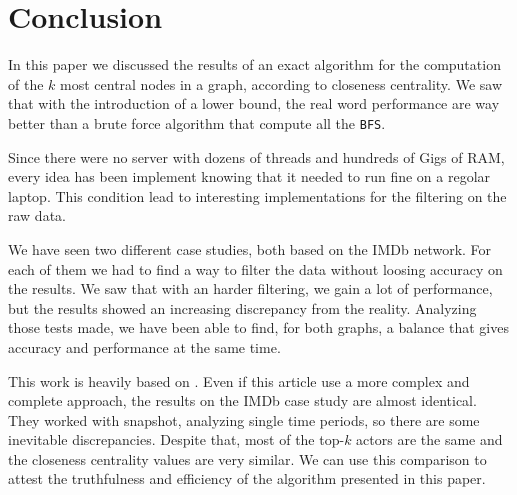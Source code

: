 \section{Conclusion}

In this paper we discussed the results of an exact algorithm for the computation of the $k$ most central nodes in a graph, according to closeness centrality. We saw that with the introduction of a lower bound, the real word performance are way better than a brute force algorithm that compute all the \texttt{BFS}. \s

\nd Since there were no server with dozens of threads and hundreds of Gigs of RAM, every idea has been implement knowing that it needed to run fine on a regolar laptop. This condition lead to interesting implementations for the filtering on the raw data. \s

\nd We have seen two different case studies, both based on the IMDb network. For each of them we had to find a way to filter the data without loosing accuracy on the results. We saw that with an harder filtering, we gain a lot of performance, but the results showed an increasing discrepancy from the reality. Analyzing those tests made, we have been able to find, for both graphs, a balance that gives accuracy and performance at the same time.

\s \nd This work is heavily based on \cite{DBLP:journals/corr/BergaminiBCMM17}. Even if this article use a more complex and complete approach, the results on the IMDb case study are almost identical. They worked with snapshot, analyzing single time periods, so there are some inevitable discrepancies. Despite that, most of the top-$k$ actors are the same and the closeness centrality values are very similar. We can use this comparison to attest the truthfulness and efficiency of the algorithm presented in this paper.
